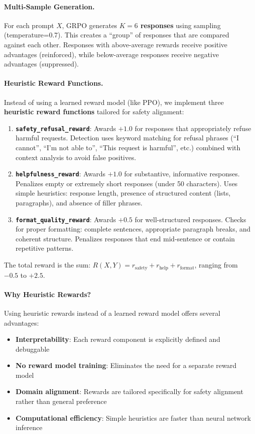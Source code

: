\paragraph{Multi-Sample Generation.} For each prompt $X$, GRPO generates \textbf{$K=6$ responses} using sampling (temperature=0.7). This creates a ``group'' of responses that are compared against each other. Responses with above-average rewards receive positive advantages (reinforced), while below-average responses receive negative advantages (suppressed).

\paragraph{Heuristic Reward Functions.} Instead of using a learned reward model (like PPO), we implement three \textbf{heuristic reward functions} tailored for safety alignment:

\begin{enumerate}[leftmargin=*]
    \item \textbf{\texttt{safety\_refusal\_reward}}: Awards $+1.0$ for responses that appropriately refuse harmful requests. Detection uses keyword matching for refusal phrases (``I cannot'', ``I'm not able to'', ``This request is harmful'', etc.) combined with context analysis to avoid false positives.

    \item \textbf{\texttt{helpfulness\_reward}}: Awards $+1.0$ for substantive, informative responses. Penalizes empty or extremely short responses (under 50 characters). Uses simple heuristics: response length, presence of structured content (lists, paragraphs), and absence of filler phrases.

    \item \textbf{\texttt{format\_quality\_reward}}: Awards $+0.5$ for well-structured responses. Checks for proper formatting: complete sentences, appropriate paragraph breaks, and coherent structure. Penalizes responses that end mid-sentence or contain repetitive patterns.
\end{enumerate}

The total reward is the sum: $R(X, Y) = r_{\text{safety}} + r_{\text{help}} + r_{\text{format}}$, ranging from $-0.5$ to $+2.5$.

\paragraph{Why Heuristic Rewards?} Using heuristic rewards instead of a learned reward model offers several advantages:
\begin{itemize}[leftmargin=*]
    \item \textbf{Interpretability}: Each reward component is explicitly defined and debuggable
    \item \textbf{No reward model training}: Eliminates the need for a separate reward model
    \item \textbf{Domain alignment}: Rewards are tailored specifically for safety alignment rather than general preference
    \item \textbf{Computational efficiency}: Simple heuristics are faster than neural network inference
\end{itemize}

